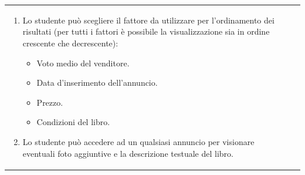 \documentclass[10pt,a4paper]{report}
\begin{document}
\begin{tabular}{lp{}}
\begin{enumerate}
			\item Lo studente può scegliere il fattore da utilizzare per l'ordinamento dei risultati (per tutti i fattori è possibile la visualizzazione sia in ordine crescente che decrescente):
			\begin{itemize}
				\item Voto medio del venditore.
				\item Data d'inserimento dell'annuncio.
				\item Prezzo.
				\item Condizioni del libro.
			\end{itemize}
			\item Lo studente può accedere ad un qualsiasi annuncio per visionare eventuali foto aggiuntive e la descrizione testuale del libro.
		\end{enumerate}
	\end{tabular}
	
\end{document}

